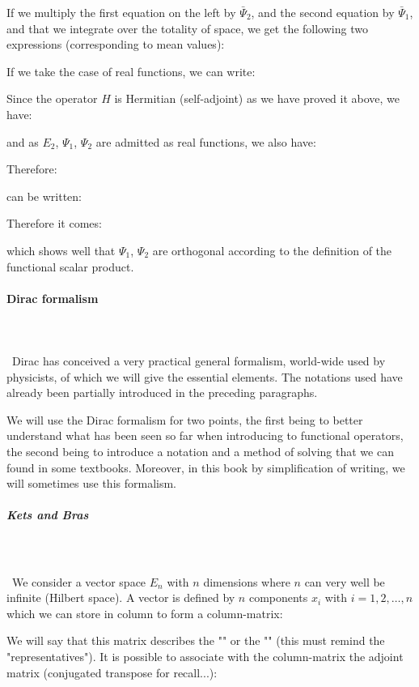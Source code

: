 	If we multiply the first equation on the left by $\bar{\Psi}_2$, and the second equation by $\bar{\Psi}_1$, and that we integrate over the totality of space, we get the following two expressions (corresponding to mean values):
	
	If we take the case of real functions, we can write:
	
	Since the operator $H$ is Hermitian (self-adjoint) as we have proved it above, we have:
	
	and as $E_2$, $\Psi_1$, $\Psi_2$ are admitted as real functions, we also have:
	
	Therefore:
	
	can be written:
	
	Therefore it comes:
	
	which shows well that $\Psi_1$, $\Psi_2$ are orthogonal according to the definition of the functional scalar product.
	
	\paragraph{Dirac formalism}\label{dirac formalism}\mbox{}\\\\\
	Dirac has conceived a very practical general formalism, world-wide used by physicists, of which we will give the essential elements. The notations used have already been partially introduced in the preceding paragraphs.

	We will use the Dirac formalism for two points, the first being to better understand what has been seen so far when introducing to functional operators, the second being to introduce a notation and a method of solving that we can found in some textbooks. Moreover, in this book by simplification of writing, we will sometimes use this formalism.

	\subparagraph{Kets and Bras}\mbox{}\\\\\
	We consider a vector space $E_n$ with $n$ dimensions where $n$ can very well be infinite (Hilbert space). A vector is defined by $n$ components $x_i$ with $i=1,2,\ldots,n$ which we can store in column to form a column-matrix:
	
	We will say that this matrix describes the "\NewTerm{right vector}" or the "\NewTerm{ket $| x\rangle$}\index{ket}" (this must remind the "representatives"). It is possible to associate with the column-matrix the adjoint matrix (conjugated transpose for recall...):
	
